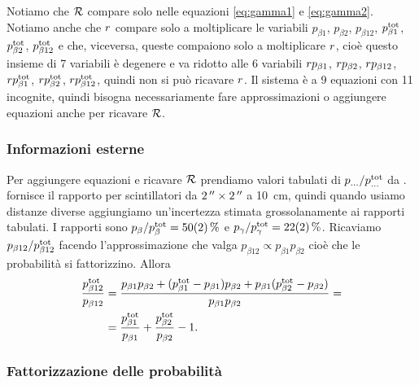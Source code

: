 Notiamo che $\Rtot$ compare solo nelle equazioni \eqref{eq:gamma1} e \eqref{eq:gamma2}.
Notiamo anche che $\R$ compare solo a moltiplicare le variabili
$p_{\beta1}$, $p_{\beta2}$, $p_{\beta12}$, $p_{\beta1}\tot$, $p_{\beta2}\tot$, $p_{\beta12}\tot$
e che, viceversa, queste compaiono solo a moltiplicare $\R$,
cioè questo insieme di 7 variabili è degenere e va ridotto alle 6 variabili
$\R p_{\beta1}$, $\R p_{\beta2}$, $\R p_{\beta12}$, $\R p_{\beta1}\tot$, $\R p_{\beta2}\tot$, $\R p_{\beta12}\tot$,
quindi non si può ricavare $\R$.
Il sistema è a 9 equazioni con 11 incognite,
quindi bisogna necessariamente fare approssimazioni o aggiungere equazioni anche per ricavare $\Rtot$.

\subsubsection{Informazioni esterne}
\label{sec:ptotp}

Per aggiungere equazioni e ricavare $\Rtot$
prendiamo valori tabulati di $p_{\dots} / p_{\dots}\tot$ da \cite{3}.
\cite{3} fornisce il rapporto per scintillatori da $\SI{2}{''}\times\SI2{''}$ a \SI{10}{cm},
quindi quando usiamo distanze diverse aggiungiamo un'incertezza stimata grossolanamente ai rapporti tabulati.
I rapporti sono
$p_\beta / p_\beta\tot = \SI{50(2)}\%$ e
$p_\gamma / p_\gamma\tot = \SI{22(2)}\%$.
Ricaviamo $p_{\beta12} / p_{\beta12}\tot$ facendo l'approssimazione che valga
$p_{\beta12}\propto p_{\beta1}p_{\beta2}$ cioè che le probabilità si fattorizzino.
Allora
\begin{align*}
	\frac{p_{\beta12}\tot}{p_{\beta12}}
	&= \frac
	{p_{\beta1}p_{\beta2} + (p_{\beta1}\tot - p_{\beta1}) p_{\beta2} + p_{\beta1} (p_{\beta2}\tot - p_{\beta2})}
	{p_{\beta1}p_{\beta2}} = \\
	&= \frac{p_{\beta1}\tot}{p_{\beta1}} + \frac{p_{\beta2}\tot}{p_{\beta2}} - 1.
\end{align*}

\subsubsection{Fattorizzazione delle probabilità}

